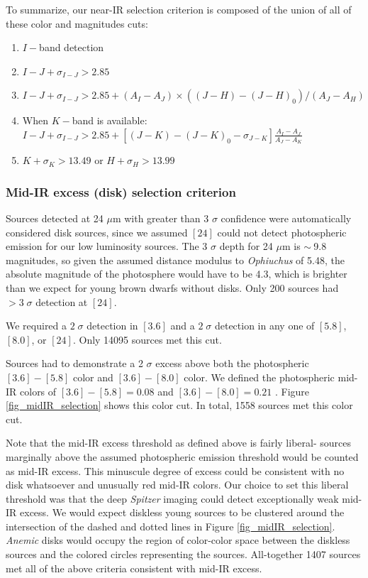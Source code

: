 To summarize, our near-IR selection criterion is composed of the union of all of these color and magnitudes cuts:
\begin{enumerate}
\item $I-$band detection
\item $I-J +\sigma_{I-J} > 2.85$
\item $I-J +\sigma_{I-J} > 2.85 + (A_I-A_J)  \times ((J-H) - (J-H)_0)/ (A_J - A_H)$
\item When $K-$band is available: $I-J + \sigma_{I-J} > 2.85 + [(J-K) - (J-K)_0 - \sigma_{J-K}]\frac{A_I-A_J}{A_J - A_K}$ 
\item $K + \sigma_{K} > 13.49$ or  $H+\sigma_{H} > 13.99$
\end{enumerate}


\subsubsection{Mid-IR excess (disk) selection criterion}
\label{sec_midIR_selection}
Sources detected at 24 $\mu$m with greater than 3 $\sigma$ confidence were automatically considered disk sources, since we assumed $[24]$ could not detect photospheric emission for our low luminosity sources.  The 3 $\sigma$ depth for 24 $\mu$m is $\sim~$9.8 magnitudes, so given the assumed distance modulus to \emph{Ophiuchus} of 5.48, the absolute magnitude of the photosphere would have to be 4.3, which is brighter than we expect for young brown dwarfs without disks.  Only 200 sources had $>3\;\sigma$ detection at $[24]$.

We required a $2\;\sigma$ detection in $[3.6]$ and a $2\;\sigma$ detection in any one of $[5.8]$, $[8.0]$, or $[24]$.  Only 14095 sources met this cut.  

Sources had to demonstrate a 2 $\sigma$  excess above both the photospheric $[3.6]-[5.8]$ color and $[3.6]-[8.0]$ color.  We defined the photospheric mid-IR colors of $[3.6]-[5.8]=0.08$ and $[3.6]-[8.0]=0.21$ \citep{2006ApJ...651..502P}.  Figure \ref{fig_midIR_selection} shows this color cut.  In total, 1558 sources met this color cut.  

Note that the mid-IR excess threshold as defined above is fairly liberal- sources marginally above the assumed photospheric emission threshold would be counted as mid-IR excess.  This minuscule degree of excess could be consistent with no disk whatsoever and unusually red mid-IR colors.  Our choice to set this liberal threshold was that the deep \emph{Spitzer} imaging could detect exceptionally weak mid-IR excess.  We would expect diskless young sources to be clustered around the intersection of the dashed and dotted lines in Figure \ref{fig_midIR_selection}.  \emph{Anemic} disks would occupy the region of color-color space between the diskless sources and the colored circles representing the \citet{allers06} sources.  All-together 1407 sources met all of the above criteria consistent with mid-IR excess.


